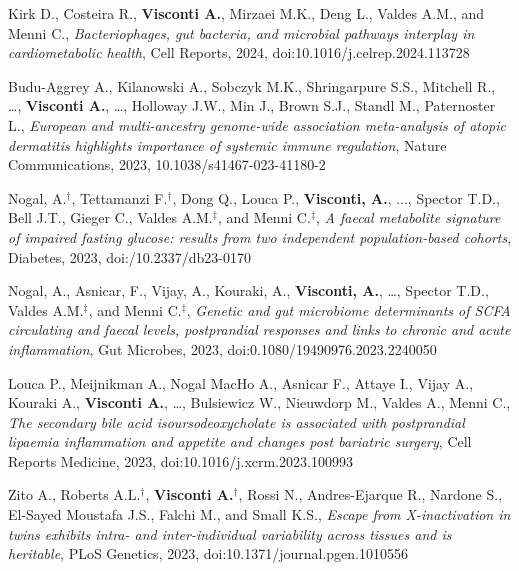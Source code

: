 {\begin{itemize}
		 Kirk D., Costeira R., \textbf{Visconti A.}, Mirzaei M.K., Deng L., Valdes A.M., and Menni C., \emph{Bacteriophages, gut bacteria, and microbial pathways interplay in cardiometabolic health}, Cell Reports, 2024, doi:10.1016/j.celrep.2024.113728		
		
		  Budu-Aggrey A., Kilanowski A., Sobczyk M.K., Shringarpure S.S., Mitchell R., \dots,  \textbf{Visconti A.}, \dots, Holloway J.W., Min J., Brown S.J., Standl M., Paternoster L., \emph{European and multi-ancestry genome-wide association meta-analysis of atopic dermatitis highlights importance of systemic immune regulation}, Nature Communications, 2023, 10.1038/s41467-023-41180-2
		
		 Nogal, A.$^{\textbf{$\dag $}}$, Tettamanzi F.$^{\textbf{$\dag $}}$, Dong Q., Louca P., \textbf{Visconti, A.}, ...,  Spector T.D., Bell J.T., Gieger C., Valdes A.M.$^{\textbf{$\ddag $}}$, and Menni C.$^{\textbf{$\ddag $}}$, \emph{A faecal metabolite signature of impaired fasting glucose: results from two independent population-based cohorts}, Diabetes, 2023, doi:/10.2337/db23-0170
		
		 Nogal, A., Asnicar, F., Vijay, A., Kouraki, A., \textbf{Visconti, A.}, \dots, Spector T.D., Valdes A.M.$^{\textbf{$\ddag $}}$, and Menni C.$^{\textbf{$\ddag $}}$, \emph{Genetic and gut microbiome determinants of SCFA circulating and faecal levels, postprandial responses and links to chronic and acute inflammation}, Gut Microbes, 2023, doi:0.1080/19490976.2023.2240050
		
		 Louca P., Meijnikman A., Nogal MacHo A., Asnicar F., Attaye I., Vijay A., Kouraki A., \textbf{Visconti A.}, \dots, Bulsiewicz W., Nieuwdorp M., Valdes A., Menni C., \emph{The secondary bile acid isoursodeoxycholate is associated with postprandial lipaemia inflammation and appetite and changes post bariatric surgery}, Cell Reports Medicine, 2023, doi:10.1016/j.xcrm.2023.100993
		
		  Zito A., Roberts A.L.$^{\textbf{$\dag $}}$, \textbf{Visconti A.}$^{\textbf{$\dag $}}$, Rossi N., Andres-Ejarque R., Nardone S., El-Sayed Moustafa J.S., Falchi M., and Small K.S., \emph{Escape from X-inactivation in twins exhibits intra- and inter-individual variability across tissues and is heritable}, PLoS Genetics, 2023, doi:10.1371/journal.pgen.1010556
									

	\end{itemize}
}

